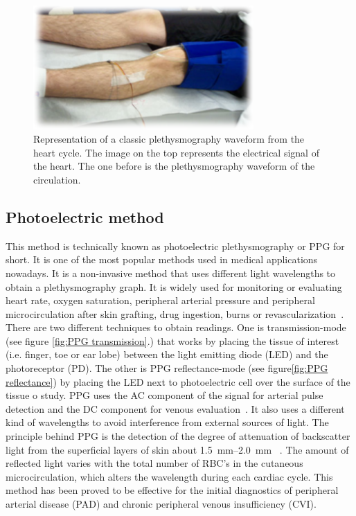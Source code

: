 \begin{figure}[!htpb]
	\centering
	\includegraphics[width=0.75\textwidth,keepaspectratio,trim={0.5cm 0.5cm 0.5cm 0.5cm}, clip]{figure6}    
	\caption[Strain gauge plethysmography]{Representation of a classic plethysmography waveform from the heart cycle. The image on the top represents the electrical signal of the heart. The one before is the plethysmography waveform of the circulation.}
	\label{fig:strain gauge}
\end{figure}


\subsection{Photoelectric method}
\label{section literature 3.4}
This method is technically known as photoelectric plethysmography or PPG for short. It is one of the most popular methods used in medical applications nowadays. It is a non-invasive method that uses different light wavelengths to obtain a plethysmography graph. It is widely used for monitoring or evaluating heart rate, oxygen saturation, peripheral arterial pressure and peripheral microcirculation after skin grafting, drug ingestion, burns or revascularization~\cite{holohan1996plethysmography}. There are two different techniques to obtain readings. One is transmission-mode (see figure \ref{fig:PPG transmission}.) that works by placing the tissue of interest (i.e. finger, toe or ear lobe) between the light emitting diode (LED) and the photoreceptor (PD).  The other is PPG reflectance-mode (see figure\ref{fig:PPG reflectance}) by placing the LED next to photoelectric cell over the surface of the tissue o study. PPG uses the AC component of the signal for arterial pulse detection and the DC component for venous evaluation~\cite{higgins1986photoplethysmographic}. It also uses a different kind of wavelengths to avoid interference from external sources of light. The principle behind PPG is the detection of the degree of attenuation of backscatter light from the superficial layers of skin about \SIrange{1.5}{2.0}{\milli\meter} ~\cite{holohan1996plethysmography,kim1986pulse}. The amount of reflected light varies with the total number of RBC’s in the cutaneous microcirculation, which alters the wavelength during each cardiac cycle. This method has been proved to be effective for the initial diagnostics of peripheral arterial disease (PAD) and chronic peripheral venous insufficiency (CVI).

